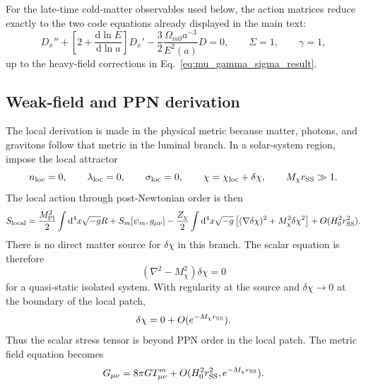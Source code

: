 \documentclass[aps,prd,reprint,nofootinbib,superscriptaddress,longbibliography]{revtex4-2}
\newcommand{\dd}{\mathrm{d}}
\newcommand{\mpl}{M_{\rm Pl}}
\begin{document}
For the late-time cold-matter observables used below, the action matrices reduce exactly to the two code equations already displayed in the main text:
\begin{equation}
  D_x''+\left[2+\frac{\dd\ln E}{\dd\ln a}\right]D_x'
  -\frac32\frac{\Omega_{m0}a^{-3}}{E^2(a)}D=0,
  \qquad \Sigma=1,
  \qquad \gamma=1,
  \label{eq:late_growth_from_expanded_matrices}
\end{equation}
up to the heavy-field corrections in Eq.~\eqref{eq:mu_gamma_sigma_result}.

\subsection{Weak-field and PPN derivation}
\label{app:explicit_ppn_derivation}

The local derivation is made in the physical metric because matter, photons, and gravitons follow that metric in the luminal branch. In a solar-system region, impose the local attractor
\begin{equation}
  n_{\rm loc}=0,
  \qquad
  \lambda_{\rm loc}=0,
  \qquad
  \sigma_{\rm loc}=0,
  \qquad
  \chi=\chi_{\rm loc}+\delta\chi,
  \qquad
  M_\chi r_{\rm SS}\gg1 .
  \label{eq:local_attractor_ppn_addendum}
\end{equation}
The local action through post-Newtonian order is then
\begin{equation}
  S_{\rm local}=\frac{\mpl^2}{2}\int\dd^4x\sqrt{-g}R+S_m[\psi_m,g_{\mu\nu}]
  -\frac{Z_\chi}{2}\int\dd^4x\sqrt{-g}\left[(\nabla\delta\chi)^2+M_\chi^2\delta\chi^2\right]+O(H_0^2r_{\rm SS}^2).
  \label{eq:local_action_ppn_addendum}
\end{equation}
There is no direct matter source for $\delta\chi$ in this branch. The scalar equation is therefore
\begin{equation}
  (\nabla^2-M_\chi^2)\delta\chi=0
  \label{eq:local_scalar_yukawa_homogeneous}
\end{equation}
for a quasi-static isolated system. With regularity at the source and $\delta\chi\rightarrow0$ at the boundary of the local patch,
\begin{equation}
  \delta\chi=0+O(e^{-M_\chi r_{\rm SS}}).
\end{equation}
Thus the scalar stress tensor is beyond PPN order in the local patch. The metric field equation becomes
\begin{equation}
  G_{\mu\nu}=8\pi G T_{\mu\nu}^{m}+O(H_0^2r_{\rm SS}^2,e^{-M_\chi r_{\rm SS}}).
  \label{eq:local_Einstein_ppn}
\end{equation}
\end{document}
